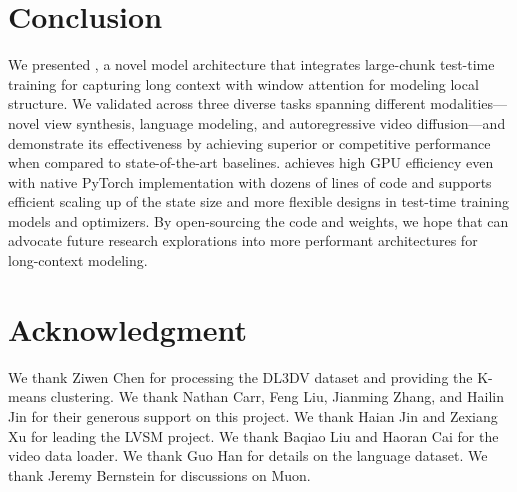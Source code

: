 \section{Conclusion} \label{sec:conclusion}
We presented \methodname{}, a novel model architecture that integrates large-chunk test-time training for capturing long context with window attention for modeling local structure. 
We validated \methodname{} across three diverse tasks spanning different modalities---novel view synthesis, language modeling, and autoregressive video diffusion---and demonstrate its effectiveness  
by achieving superior or competitive performance when compared to state-of-the-art baselines.
\methodname{} achieves high GPU efficiency even with native PyTorch implementation with dozens of lines of code and supports efficient scaling
up of the state size and more flexible designs in test-time training models and optimizers.  
By open-sourcing the code and weights, we hope that \methodname{} can advocate future research explorations 
into more performant architectures for long-context modeling.

\section*{Acknowledgment}

We thank Ziwen Chen for processing the DL3DV dataset and providing the K-means clustering.
We thank Nathan Carr, Feng Liu, Jianming Zhang, and Hailin Jin for their generous support on this project. 
We thank Haian Jin and Zexiang Xu for leading the LVSM project. 
We thank Baqiao Liu and Haoran Cai for the video data loader. We thank Guo Han for details on the language dataset. We thank Jeremy Bernstein for discussions on Muon. 